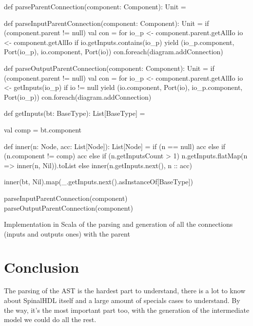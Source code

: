 \begin{listing}[H]
  \centering
  \begin{scalacode}
  def parseParentConnection(component: Component): Unit = {

    def parseInputParentConnection(component: Component): Unit = {
      if (component.parent != null) {
        val con = for {
          io_p <- component.parent.getAllIo
          io <- component.getAllIo
          if io.getInputs.contains(io_p)
        } yield (io_p.component, Port(io_p), io.component, Port(io))
        con.foreach(diagram.addConnection)
      }
    }

    def parseOutputParentConnection(component: Component): Unit = {
      if (component.parent != null) {
        val con = for {
          io_p <- component.parent.getAllIo
          io <- getInputs(io_p)
          if io != null
        } yield (io.component, Port(io), io_p.component, Port(io_p))
        con.foreach(diagram.addConnection)
      }
    }

    def getInputs(bt: BaseType): List[BaseType] = {
      val comp = bt.component

      def inner(n: Node, acc: List[Node]): List[Node] = {
        if (n == null) acc
        else if (n.component != comp) {
          acc
        }
        else if (n.getInputsCount > 1) {
          n.getInputs.flatMap(n => inner(n, Nil)).toList
        }
        else {
          inner(n.getInputs.next(), n :: acc)
        }
      }

      inner(bt, Nil).map(_.getInputs.next().asInstanceOf[BaseType])
  }

    parseInputParentConnection(component)
    parseOutputParentConnection(component)
  }
\end{scalacode}
  \caption[Parsing and generation of the connections with the
  parent]{Implementation in Scala of the parsing and generation of all the
    connections (inputs and outputs ones) with the parent}
  \label{lst:parse-parent-connection}
\end{listing}

\section{Conclusion}
\label{sec:ast-parsing-conclusion}

The parsing of the AST is the hardest part to understand, there is a lot to know
about SpinalHDL itself and a large amount of specials cases to understand. By the
way, it's the most important part too, with the generation of the
intermediate model we could do all the rest.

